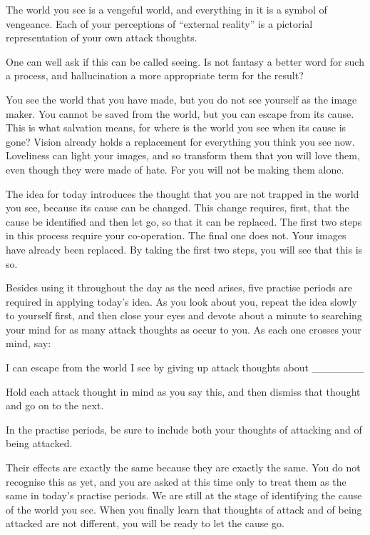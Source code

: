 The world you see is a vengeful world, and everything in it is a symbol of vengeance. Each of your perceptions of ``external reality'' is a pictorial representation of your own attack thoughts.

One can well ask if this can be called seeing. Is not fantasy a better word for such a process, and hallucination a more appropriate term for the result?

You see the world that you have made, but you do not see yourself as the image maker. You cannot be saved from the world, but you can escape from its cause. This is what salvation means, for where is the world you see when its cause is gone? Vision already holds a replacement for everything you think you see now. Loveliness can light your images, and so transform them that you will love them, even though they were made of hate. For you will not be making them alone.

The idea for today introduces the thought that you are not trapped in the world you see, because its cause can be changed. This change requires, first, that the cause be identified and then let go, so that it can be replaced. The first two steps in this process require your co-operation. The final one does not. Your images have already been replaced. By taking the first two steps, you will see that this is so.

Besides using it throughout the day as the need arises, five practise periods are required in applying today's idea. As you look about you, repeat the idea slowly to yourself first, and then close your eyes and devote about a minute to searching your mind for as many attack thoughts as occur to you. As each one crosses your mind, say:

I can escape from the world I see by giving up attack thoughts about \_\_\_\_\_\_\_


Hold each attack thought in mind as you say this, and then dismiss that thought and go on to the next.

In the practise periods, be sure to include both your thoughts of attacking and of being attacked.

Their effects are exactly the same because they are exactly the same. You do not recognise this as yet, and you are asked at this time only to treat them as the same in today's practise periods. We are still at the stage of identifying the cause of the world you see. When you finally learn that thoughts of attack and of being attacked are not different, you will be ready to let the cause go.

